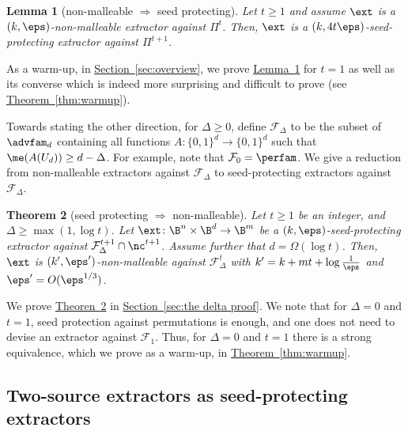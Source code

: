 \documentclass[11pt]{article}
\numberwithin{equation}{section}
\newtheorem{theorem}{Theorem}[section]
\newtheorem{lemma}[theorem]{Lemma}
\theoremstyle{definition}
\theoremstyle{plain}
\newcommand{\expref}[2]{\hyperref[#2]{#1~\ref{#2}}}
\begin{document}
\begin{lemma}[non-malleable $\Longrightarrow$ seed protecting]\label{lem:intro nm is sp}
	Let $t \ge 1$ and assume $\ext$ is a $(k,\eps)$-non-malleable extractor
	against $\Pi^t$. Then, $\ext$ is a $(k,4t\eps)$-seed-protecting extractor against $\Pi^{t+1}$.
\end{lemma}

As a %
warm-up,  %
in \expref{Section}{sec:overview}, we prove \expref{Lemma}{lem:intro nm is sp} for $t=1$ as well as its converse which is indeed more surprising and difficult to prove (see \expref{Theorem}{thm:warmup}). 

Towards stating the other direction, 
for $\Delta \ge 0$, define $\mathcal{F}_{\Delta}$ to be the subset of $\advfam_d$ containing all functions $A \colon \{0,1\}^d \to \{0,1\}^d$ such that 
$\me(A(U_d)) \ge d-\Delta$. %
%
%
For example, note that $\mathcal{F}_0 = \perfam$. We
give a reduction from non-malleable extractors against $\mathcal{F}_\Delta$ to seed-protecting extractors against $\mathcal{F}_\Delta$. 

\begin{theorem}[seed protecting $\Longrightarrow$ non-malleable]\label{thm:last one}
	Let $t \ge 1$ be an integer, and $\Delta \ge \max(1,\log{t})$.
	Let $\ext\colon\B^{n}\times\B^{d}\rightarrow\B^m$ be a $(k,\eps)$-seed-protecting extractor against $\mathcal{F}^{t+1}_{\Delta} \cap \nc^{t+1}$. Assume further that $d = \Omega(\log{t})$. Then, $\ext$ is $(k',\eps')$-non-malleable against $\mathcal{F}_{\Delta}^t$ with $k' = k+mt+\log\frac1{\eps}$ and $\eps' = O(\eps^{1/3})$.
\end{theorem}

We prove \expref{Theoren}{thm:last one} in \expref{Section}{sec:the delta proof}. 
We note that for $\Delta = 0$ and $t = 1$, seed protection against
permutations is enough, and one does not need to devise an extractor against $\mathcal{F}_1$.
Thus, for $\Delta = 0$ and $t = 1$ there is a strong equivalence, which we prove 
as a warm-up, in \expref{Theorem}{thm:warmup}.


%

%



%

%

\subsection{Two-source extractors as seed-protecting extractors}\label{sec:intro two source sp}
\end{document}
